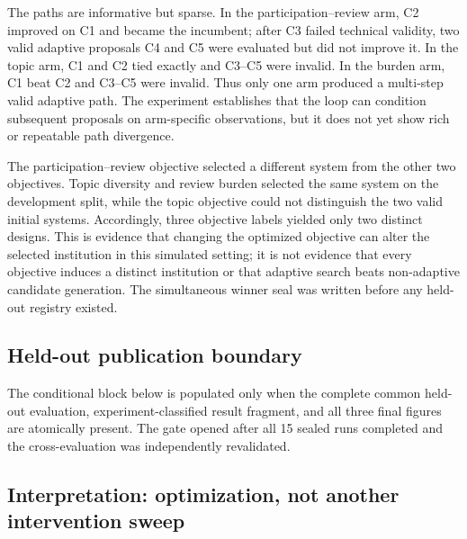 The paths are informative but sparse. In the participation--review arm, C2
improved on C1 and became the incumbent; after C3 failed technical validity,
two valid adaptive proposals C4 and C5 were evaluated but did not improve it.
In the topic arm, C1 and C2 tied exactly and C3--C5 were invalid. In the burden
arm, C1 beat C2 and C3--C5 were invalid. Thus only one arm produced a multi-step
valid adaptive path. The experiment establishes that the loop can condition
subsequent proposals on arm-specific observations, but it does not yet show
rich or repeatable path divergence.

The participation--review objective selected a different system from the other
two objectives. Topic diversity and review burden selected the same system on
the development split, while the topic objective could not distinguish the two
valid initial systems. Accordingly, three objective labels yielded only two
distinct designs. This is evidence that changing the optimized objective can
alter the selected institution in this simulated setting; it is not evidence
that every objective induces a distinct institution or that adaptive search
beats non-adaptive candidate generation. The simultaneous winner seal was
written before any held-out registry existed.

\subsection{Held-out publication boundary}

The conditional block below is populated only when the complete common
held-out evaluation, experiment-classified result fragment, and all three final
figures are atomically present. The gate opened after all 15 sealed runs
completed and the cross-evaluation was independently revalidated.

\ifmetricconditionedresults

\else
\begin{center}
\end{center}
\fi

\subsection{Interpretation: optimization, not another intervention sweep}

